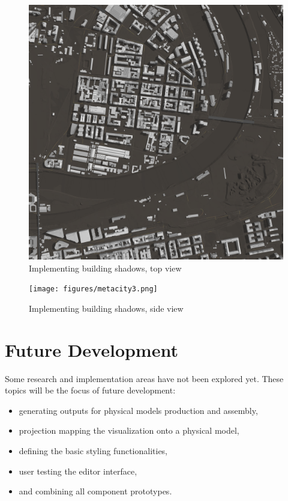 \begin{figure}[h]
    \centering
    \includegraphics[width=\linewidth]{figures/metacity2.png}
    \caption{Implementing building shadows, top view}
\end{figure}

\begin{figure}[h]
    \centering
    \texttt{[image: figures/metacity3.png]}
    \caption{Implementing building shadows, side view}
    \label{fig:metacit5}
\end{figure}

\section{Future Development}
Some research and implementation areas have not been explored yet. These topics will be the focus of future development:
\begin{itemize}
    \item generating outputs for physical models production and assembly,
    \item projection mapping the visualization onto a physical model,
    \item defining the basic styling functionalities,
    \item user testing the editor interface,
    \item and combining all component prototypes.
\end{itemize}


